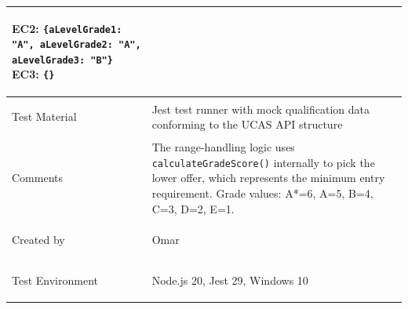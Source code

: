 \begin{table}[h!]
\begin{tabularx}{\linewidth}{@{} >{\bfseries\raggedright}p{} >{\raggedright\arraybackslash}X @{}}
                       \textbf{EC2:} \texttt{\{aLevelGrade1: "A", aLevelGrade2: "A", aLevelGrade3: "B"\}} \newline
                       \textbf{EC3:} \texttt{\{\}} \\
\midrule
Test Material        & Jest test runner with mock qualification data conforming to the UCAS API structure \\
\addlinespace[2pt]
Comments             & The range-handling logic uses \texttt{calculateGradeScore()} internally to pick the lower offer, which represents the minimum entry requirement. Grade values: A*=6, A=5, B=4, C=3, D=2, E=1. \\
\addlinespace[2pt]
Created by           & Omar \\
\addlinespace[2pt]
Test Environment     & Node.js 20, Jest 29, Windows 10 \\
\bottomrule
\end{tabularx}
\end{table}

